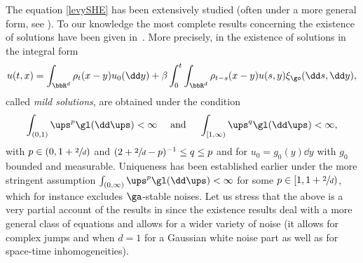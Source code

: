 The equation \eqref{levySHE} has been extensively studied (often under a more general form, see \eg \cite{Mueller98, Loubert98}). To our knowledge the most complete results concerning the existence of solutions have been given in~\cite{Chong17}.
More precisely, in \cite{Chong17} the existence of solutions in the integral form
\begin{equation}\label{integralz}
u(t,x)= \int_{\bbR^d} \rho_{t}(x-y) u_0(\dd y) +\beta \int^t_0\int_{\bbR^d} \rho_{t-s}(x-y) u(s,y)
\xi_{\go}(\dd s, \dd y),
\end{equation}
called \textit{mild solutions},
are obtained under the condition
\begin{equation}\label{hypochong}
\int_{(0,1)} \ups^p \gl(\dd\ups)<\infty \quad \text{ and } \quad \int_{[1,\infty)} \ups^q \gl(\dd\ups)<\infty,
\end{equation}
with $p\in (0,1+\sfrac2d)$ and $ (2+\sfrac{2}{d}-p)^{-1} \le q\le p$ and for $u_0=g_0(y) \dd y$ with $g_0$ bounded and measurable.
Uniqueness has been established earlier \cite{Loubert98} under the more stringent assumption
$\int_{(0,\infty)} \ups^p \gl(\dd\ups)<\infty$ for some $p\in [1,1+\sfrac2d)$, which for instance excludes $\ga$-stable noises.
Let us stress that the above is a very partial account of the results in \cite{Chong17} since the existence results deal with a more general class of equations and allows for a wider variety of noise (it allows for complex jumps and when $d=1$ for a Gaussian white noise part as well as for space-time inhomogeneities).

